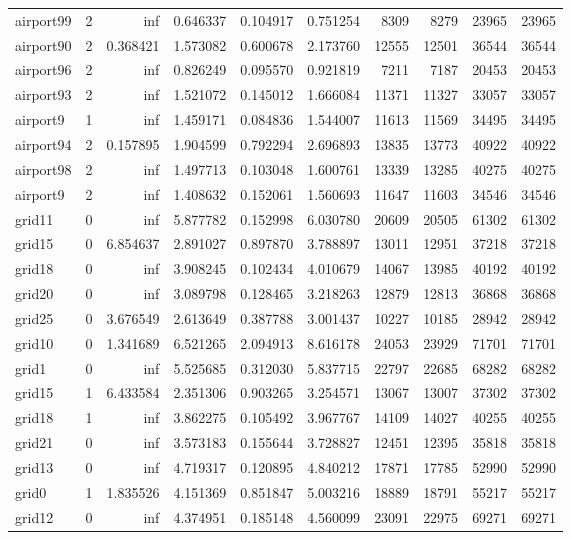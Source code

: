 \begin{longtable}{|l|r|r|r|r|r|r|r|r|r|}
airport99 & 2 & inf & 0.646337 & 0.104917 & 0.751254 & 8309 & 8279 & 23965 & 23965 \\
airport90 & 2 & 0.368421 & 1.573082 & 0.600678 & 2.173760 & 12555 & 12501 & 36544 & 36544 \\
airport96 & 2 & inf & 0.826249 & 0.095570 & 0.921819 & 7211 & 7187 & 20453 & 20453 \\
airport93 & 2 & inf & 1.521072 & 0.145012 & 1.666084 & 11371 & 11327 & 33057 & 33057 \\
airport9 & 1 & inf & 1.459171 & 0.084836 & 1.544007 & 11613 & 11569 & 34495 & 34495 \\
airport94 & 2 & 0.157895 & 1.904599 & 0.792294 & 2.696893 & 13835 & 13773 & 40922 & 40922 \\
airport98 & 2 & inf & 1.497713 & 0.103048 & 1.600761 & 13339 & 13285 & 40275 & 40275 \\
airport9 & 2 & inf & 1.408632 & 0.152061 & 1.560693 & 11647 & 11603 & 34546 & 34546 \\
grid11 & 0 & inf & 5.877782 & 0.152998 & 6.030780 & 20609 & 20505 & 61302 & 61302 \\
grid15 & 0 & 6.854637 & 2.891027 & 0.897870 & 3.788897 & 13011 & 12951 & 37218 & 37218 \\
grid18 & 0 & inf & 3.908245 & 0.102434 & 4.010679 & 14067 & 13985 & 40192 & 40192 \\
grid20 & 0 & inf & 3.089798 & 0.128465 & 3.218263 & 12879 & 12813 & 36868 & 36868 \\
grid25 & 0 & 3.676549 & 2.613649 & 0.387788 & 3.001437 & 10227 & 10185 & 28942 & 28942 \\
grid10 & 0 & 1.341689 & 6.521265 & 2.094913 & 8.616178 & 24053 & 23929 & 71701 & 71701 \\
grid1 & 0 & inf & 5.525685 & 0.312030 & 5.837715 & 22797 & 22685 & 68282 & 68282 \\
grid15 & 1 & 6.433584 & 2.351306 & 0.903265 & 3.254571 & 13067 & 13007 & 37302 & 37302 \\
grid18 & 1 & inf & 3.862275 & 0.105492 & 3.967767 & 14109 & 14027 & 40255 & 40255 \\
grid21 & 0 & inf & 3.573183 & 0.155644 & 3.728827 & 12451 & 12395 & 35818 & 35818 \\
grid13 & 0 & inf & 4.719317 & 0.120895 & 4.840212 & 17871 & 17785 & 52990 & 52990 \\
grid0 & 1 & 1.835526 & 4.151369 & 0.851847 & 5.003216 & 18889 & 18791 & 55217 & 55217 \\
grid12 & 0 & inf & 4.374951 & 0.185148 & 4.560099 & 23091 & 22975 & 69271 & 69271 \\

\end{longtable}
